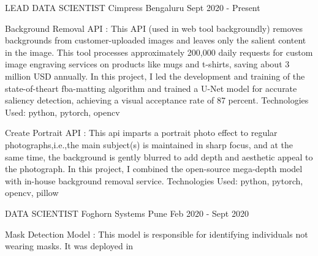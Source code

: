 
\begin{cventries}

    \cventry
    {LEAD DATA SCIENTIST} %
    {Cimpress} %
    {Bengaluru} %
    {Sept 2020 - Present} %
    {
      \begin{cvitems} %
      \item{Background Removal API : This API (used in web tool backgroundly) removes 
      backgrounds from customer-uploaded images and leaves only the salient 
      content in the image. This tool processes approximately 200,000 
      daily requests for custom image engraving services on products 
      like mugs and t-shirts, saving about 3 million USD annually. In this 
      project, I led the development and training of the state-of-theart 
      fba-matting algorithm and trained a U-Net model for accurate saliency 
      detection, achieving a visual acceptance rate of 87 percent. 
      Technologies Used: python, pytorch, opencv }
      \item{Create Portrait API : This api imparts a portrait photo effect to
      regular photographs,i.e.,the main subject(s) is maintained in sharp focus, 
      and at the same time, the background is gently blurred to add depth and 
      aesthetic appeal to the photograph. In this project, I combined the 
      open-source mega-depth model with in-house background removal service. 
      Technologies Used: python, pytorch, opencv, pillow }
	\end{cvitems}
    }
\vspace{2em} %
  \cventry
    {DATA SCIENTIST} %
    {Foghorn Systems} %
    {Pune} %
    {Feb 2020 - Sept 2020} %
    {
      \begin{cvitems} %
      \item{Mask Detection Model : This model is responsible for identifying individuals not wearing masks. It was deployed in 
}
\end{cvitems}}
\end{cventries}
